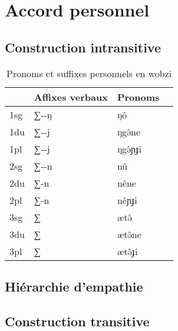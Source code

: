 \documentclass[11pt, a4paper]{book}              %
\newcommand{\ipa}[1]{{\phon \mbox{#1}}} %
\begin{document}
\section{Accord personnel}

\subsection{Construction intransitive}

\begin{table}[H]
\caption{Pronoms et suffixes personnels en wobzi}\label{pron}
\centering
\begin{tabular}{llll} 
\hline
	&Affixes verbaux &	Pronoms \\
	\hline
1sg &	\ipa{∑-\ipa{-ŋ}}  &	\ipa{ŋô} \\
1du &	\ipa{∑-\ipa{-j}} &	\ipa{ŋgə̂ne}\\
1pl &	\ipa{∑-\ipa{-j}} &		\ipa{ŋgə̂ɲɟi}\\
2sg &	\ipa{∑-\ipa{-n}} &		\ipa{nû} \\
2du &	\ipa{∑-n} &		\ipa{nêne} \\
2pl &	\ipa{∑-n} &		\ipa{nêɲɟi} \\
3sg &	∑  &		\ipa{ætə̂} \\ 
3du &	∑ &	\ipa{ætə̂ne} \\
3pl &	∑ &		\ipa{ætə̂ɟi} \\
\hline
\end{tabular}
\end{table}

\subsection{Hiérarchie d'empathie}
\subsection{Construction transitive}
\end{document}
